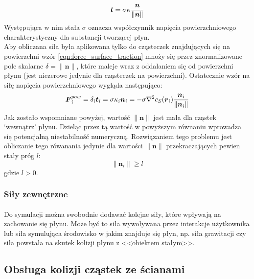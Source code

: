 \begin{equation}
\boldsymbol{t} = \sigma \kappa {\boldsymbol{n} \over \|\boldsymbol{n}\|}
\label{eqn:force_surface_traction}
\end{equation}
Występująca w nim stała $\sigma$ oznacza współczynnik napięcia powierzchniowego charakterystyczny dla substancji tworzącej płyn.\\
Aby obliczana siła była aplikowana tylko do cząsteczek znajdujących się na powierzchni wzór \eqref{eqn:force_surface_traction} mnoży się przez znormalizowane pole skalarne $\delta = \|\boldsymbol{n}\|$, które maleje wraz z oddalaniem się od powierzchni płynu (jest niezerowe jedynie dla cząsteczek na powierzchni). Ostatecznie wzór na siłę napięcia powierzchniowego wygląda następująco:
\begin{equation}
\boldsymbol{F}_i^{pow} = \delta_i \boldsymbol{t}_i = \sigma \kappa_i \boldsymbol{n}_i = - \sigma \nabla^2{c}_S(\boldsymbol{r}_i) {\boldsymbol{n}_i \over \|\boldsymbol{n}_i\|}
\label{eqn:sph_force_surface_tension}
\end{equation}
Jak zostało wspomniane powyżej, wartość $\|\boldsymbol{n}\|$ jest mała dla cząstek `wewnątrz' płynu. Dzieląc przez tą wartość w powyższym równaniu wprowadza się potencjalną niestabilność numeryczną. Rozwiązaniem tego problemu jest obliczanie tego rówanania jedynie dla wartości $\|\boldsymbol{n}\|$ przekraczających pewien stały próg $l$:
\begin{equation}
\|\boldsymbol{n}_i\| \geq l
\end{equation}
gdzie $l > 0$.\\
\par

\subsubsection{Siły zewnętrzne}

\paragraph{}
Do symulacji można swobodnie dodawać kolejne siły, które wpływają na zachowanie się płynu. Może być to siła wywoływana przez interakcje użytkownika lub siła symulująca środowisko w jakim znajduje się płyn, np. siła grawitacji czy siła powstała na skutek kolizji płynu z <<obiektem stałym>>.
\par


\subsection{Obsługa kolizji cząstek ze ścianami}

